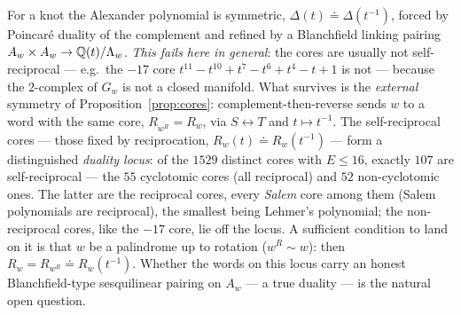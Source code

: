 \begin{rem}\label{rem:duality}
For a knot the Alexander polynomial is symmetric, $\Delta(t)\doteq\Delta(t^{-1})$, forced by
Poincar\'e duality of the complement and refined by a Blanchfield linking pairing
$A_w\times A_w\to\mathbb{Q}(t)/\Lambda_w$. \emph{This fails here in general}: the cores are usually not
self-reciprocal --- e.g.\ the $-17$ core $t^{11}-t^{10}+t^{7}-t^{6}+t^{4}-t+1$ is not --- because
the $2$-complex of $G_w$ is not a closed manifold. What survives is the \emph{external} symmetry
of Proposition~\ref{prop:cores}: complement-then-reverse sends $w$ to a word with the same core,
$R_{\overline{w^{R}}}=R_w$, via $S\leftrightarrow T$ and $t\mapsto t^{-1}$. The self-reciprocal
cores --- those fixed by reciprocation, $R_w(t)\doteq R_w(t^{-1})$ --- form a distinguished
\emph{duality locus}: of the $1529$ distinct cores with $E\le16$, exactly $107$ are
self-reciprocal --- the $55$ cyclotomic cores (all reciprocal) and $52$ non-cyclotomic ones. The
latter are the reciprocal cores, every \emph{Salem} core among them (Salem polynomials are
reciprocal), the smallest being Lehmer's polynomial; the non-reciprocal cores, like the $-17$
core, lie off the locus. A sufficient condition to land on it is that $w$ be a palindrome up to
rotation ($w^{R}\sim w$): then $R_w=R_{w^{R}}\doteq R_w(t^{-1})$. Whether the words on this locus
carry an honest Blanchfield-type sesquilinear pairing on $A_w$ --- a true duality --- is the
natural open question.
\end{rem}
